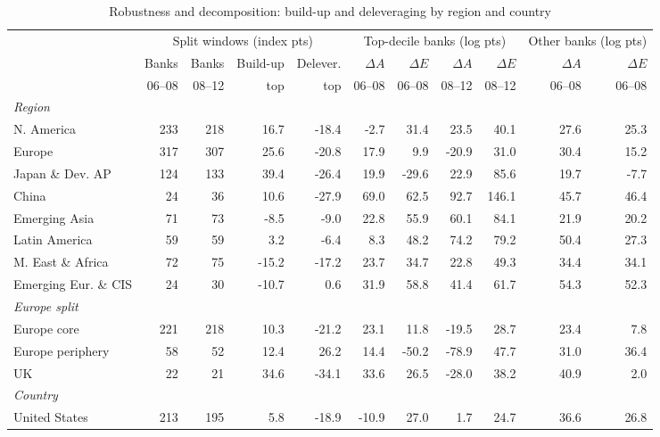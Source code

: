 \documentclass[11pt]{article}
\begin{document}
\clearpage

\begin{table}[htbp]
\centering
\footnotesize
\begin{threeparttable}
\caption{Robustness and decomposition: build-up and deleveraging by region and country}
\label{tab:region_gfc_decomp}
\setlength{\tabcolsep}{4pt}
\begin{tabular}{lrrrrrrrrrr}
\toprule
 & \multicolumn{4}{c}{Split windows (index pts)} & \multicolumn{4}{c}{Top-decile banks (log pts)} & \multicolumn{2}{c}{Other banks (log pts)} \\
\cmidrule(lr){2-5}\cmidrule(lr){6-9}\cmidrule(lr){10-11}
 & Banks & Banks & Build-up & Delever. & $\Delta A$ & $\Delta E$ & $\Delta A$ & $\Delta E$ & $\Delta A$ & $\Delta E$ \\
 & 06--08 & 08--12 & top & top & 06--08 & 06--08 & 08--12 & 08--12 & 06--08 & 06--08 \\
\midrule
\multicolumn{11}{l}{\textit{Region}} \\
N. America & 233 & 218 & 16.7 & -18.4 & -2.7 & 31.4 & 23.5 & 40.1 & 27.6 & 25.3 \\
Europe & 317 & 307 & 25.6 & -20.8 & 17.9 & 9.9 & -20.9 & 31.0 & 30.4 & 15.2 \\
Japan \& Dev. AP & 124 & 133 & 39.4 & -26.4 & 19.9 & -29.6 & 22.9 & 85.6 & 19.7 & -7.7 \\
China & 24 & 36 & 10.6 & -27.9 & 69.0 & 62.5 & 92.7 & 146.1 & 45.7 & 46.4 \\
Emerging Asia & 71 & 73 & -8.5 & -9.0 & 22.8 & 55.9 & 60.1 & 84.1 & 21.9 & 20.2 \\
Latin America & 59 & 59 & 3.2 & -6.4 & 8.3 & 48.2 & 74.2 & 79.2 & 50.4 & 27.3 \\
M. East \& Africa & 72 & 75 & -15.2 & -17.2 & 23.7 & 34.7 & 22.8 & 49.3 & 34.4 & 34.1 \\
Emerging Eur. \& CIS & 24 & 30 & -10.7 & 0.6 & 31.9 & 58.8 & 41.4 & 61.7 & 54.3 & 52.3 \\
\multicolumn{11}{l}{\textit{Europe split}} \\
Europe core & 221 & 218 & 10.3 & -21.2 & 23.1 & 11.8 & -19.5 & 28.7 & 23.4 & 7.8 \\
Europe periphery & 58 & 52 & 12.4 & 26.2 & 14.4 & -50.2 & -78.9 & 47.7 & 31.0 & 36.4 \\
UK & 22 & 21 & 34.6 & -34.1 & 33.6 & 26.5 & -28.0 & 38.2 & 40.9 & 2.0 \\
\multicolumn{11}{l}{\textit{Country}} \\
United States & 213 & 195 & 5.8 & -18.9 & -10.9 & 27.0 & 1.7 & 24.7 & 36.6 & 26.8 \\

\end{tabular}
\end{threeparttable}
\end{table}
\end{document}
